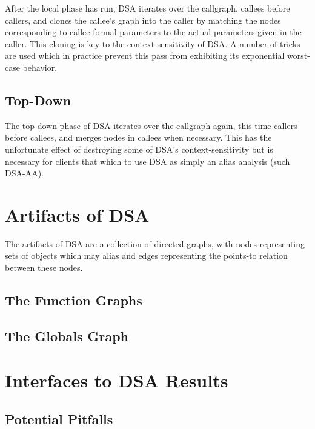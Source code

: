 \documentclass{article}
\begin{document}
After the local phase has run, DSA iterates over the callgraph,
callees before callers, and clones the callee's graph into the caller
by matching the nodes corresponding to callee formal parameters to the
actual parameters given in the caller.  This cloning is key to the
context-sensitivity of DSA.  A number of tricks are used which in
practice prevent this pass from exhibiting its exponential worst-case
behavior.

\subsection{Top-Down}

The top-down phase of DSA iterates over the callgraph again, this time
callers before callees, and merges nodes in callees when necessary.
This has the unfortunate effect of destroying some of DSA's
context-sensitivity but is necessary for clients that which to use DSA
as simply an alias analysis (such DSA-AA).

\section{Artifacts of DSA}

The artifacts of DSA are a collection of directed graphs, with nodes
representing sets of objects which may alias and edges representing
the points-to relation between these nodes.

\subsection{The Function Graphs}



\subsection{The Globals Graph}

\section{Interfaces to DSA Results}


\subsection{Potential Pitfalls}
\end{document}
